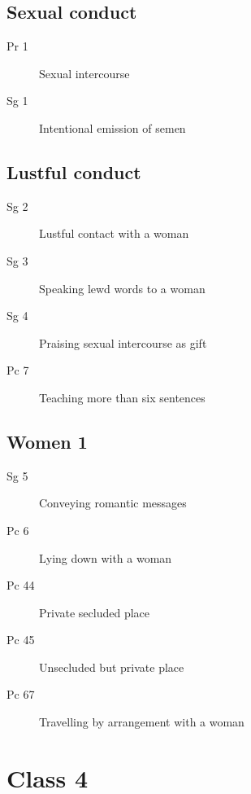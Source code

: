 \documentclass[11pt,oneside]{memoir}
\begin{document}
\begin{multicols}{2}

\section{Sexual conduct}

\begin{description}
\item[Pr 1 \orig] Sexual intercourse%
\item[Sg 1 \orig] Intentional emission of semen%
\end{description}

\section{Lustful conduct}

\begin{description}
\item[Sg 2 \orig] Lustful contact with a woman%
\item[Sg 3 \orig] Speaking lewd words to a woman%
\item[Sg 4 \orig] Praising sexual intercourse as gift%
\item[Pc 7] Teaching more than six sentences
\end{description}

\columnbreak

\section{Women 1}

\begin{description}
\item[Sg 5 \orig] Conveying romantic messages
\item[Pc 6 \orig] Lying down with a woman%
\item[Pc 44] Private secluded place
\item[Pc 45] Unsecluded but private place
\item[Pc 67 \orig] Travelling by arrangement with a woman%
\end{description}

\end{multicols}

\clearpage

\chapter{Class 4}
\end{document}
